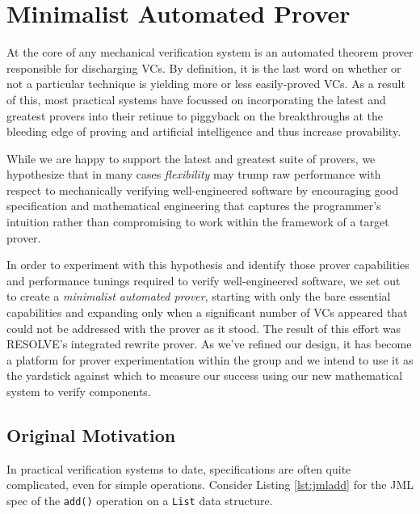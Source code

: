 


\chapter{Minimalist Automated Prover\label{ch:prover}}
At the core of any mechanical verification system is an automated theorem prover responsible for discharging VCs.  By definition, it is the last word on whether or not a particular technique is yielding more or less easily-proved VCs.  As a result of this, most practical systems have focussed on incorporating the latest and greatest provers into their retinue to piggyback on the breakthroughs at the bleeding edge of proving and artificial intelligence and thus increase provability.

While we are happy to support the latest and greatest suite of provers, we hypothesize that in many cases \emph{flexibility} may trump raw performance with respect to mechanically verifying well-engineered software by encouraging good specification and mathematical engineering that captures the programmer's intuition rather than compromising to work within the framework of a target prover.

In order to experiment with this hypothesis and identify those prover capabilities and performance tunings required to verify well-engineered software, we set out to create a \emph{minimalist automated prover}, starting with only the bare essential capabilities and expanding only when a significant number of VCs appeared that could not be addressed with the prover as it stood.  The result of this effort was RESOLVE's integrated rewrite prover.  As we've refined our design, it has become a platform for prover experimentation within the group and we intend to use it as the yardstick against which to measure our success using our new mathematical system to verify components.


\section{Original Motivation}

In practical verification systems to date, specifications are often quite complicated, even for simple operations.  Consider Listing \ref{lst:jmladd} for the JML spec of the \texttt{add()} operation on a \texttt{List} data structure.

